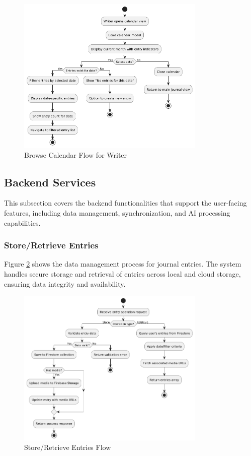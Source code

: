 \begin{figure}[H]
\centering
\includegraphics[width=0.8\textwidth]{files/imgs/browse_calendar_flow.png}
\caption{Browse Calendar Flow for Writer}
\label{fig:browse-calendar-flow}
\end{figure}

\subsection{Backend Services}\label{subsec:backendServices}

This subsection covers the backend functionalities that support the user-facing features, including data management, synchronization, and AI processing capabilities.

\subsubsection{Store/Retrieve Entries}\label{subsubsec:storeRetrieveEntries}

Figure \ref{fig:store-retrieve-entries-flow} shows the data management process for journal entries. The system handles secure storage and retrieval of entries across local and cloud storage, ensuring data integrity and availability.

\begin{figure}[H]
\centering
\includegraphics[width=0.8\textwidth]{files/imgs/store_retrieve_entries_flow.png}
\caption{Store/Retrieve Entries Flow}
\label{fig:store-retrieve-entries-flow}
\end{figure}

